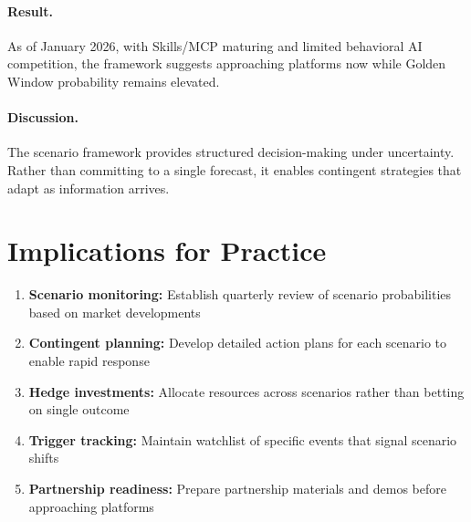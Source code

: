 \paragraph{Result.}
As of January 2026, with Skills/MCP maturing and limited behavioral AI
competition, the framework suggests approaching platforms now while
Golden Window probability remains elevated.

\paragraph{Discussion.}
The scenario framework provides structured decision-making under uncertainty.
Rather than committing to a single forecast, it enables contingent strategies
that adapt as information arrives.


\section{Implications for Practice}
\label{sec:vvv1-practice}

\begin{tcolorbox}[colback=green!5!white, colframe=green!75!black,
    title=Practical Implications]
\begin{enumerate}
\item \textbf{Scenario monitoring:} Establish quarterly review of scenario
    probabilities based on market developments
\item \textbf{Contingent planning:} Develop detailed action plans for each
    scenario to enable rapid response
\item \textbf{Hedge investments:} Allocate resources across scenarios rather
    than betting on single outcome
\item \textbf{Trigger tracking:} Maintain watchlist of specific events that
    signal scenario shifts
\item \textbf{Partnership readiness:} Prepare partnership materials and demos
    before approaching platforms
\end{enumerate}
\end{tcolorbox}


%
%

